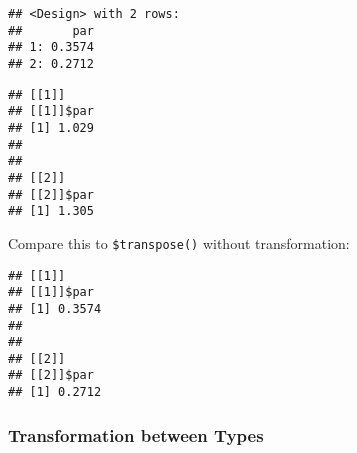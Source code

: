 \documentclass[
]{scrbook}
\newenvironment{Shaded}{\begin{snugshade}}{\end{snugshade}}
\newcommand{\AttributeTok}[1]{\textcolor[rgb]{0.77,0.63,0.00}{#1}}
\newcommand{\CommentTok}[1]{\textcolor[rgb]{0.56,0.35,0.01}{\textit{#1}}}
\newcommand{\ConstantTok}[1]{\textcolor[rgb]{0.00,0.00,0.00}{#1}}
\newcommand{\ControlFlowTok}[1]{\textcolor[rgb]{0.13,0.29,0.53}{\textbf{#1}}}
\newcommand{\DecValTok}[1]{\textcolor[rgb]{0.00,0.00,0.81}{#1}}
\newcommand{\FunctionTok}[1]{\textcolor[rgb]{0.00,0.00,0.00}{#1}}
\newcommand{\NormalTok}[1]{#1}
\newcommand{\OtherTok}[1]{\textcolor[rgb]{0.56,0.35,0.01}{#1}}
\newcommand{\SpecialCharTok}[1]{\textcolor[rgb]{0.00,0.00,0.00}{#1}}
\newcommand{\StringTok}[1]{\textcolor[rgb]{0.31,0.60,0.02}{#1}}
\renewenvironment{Shaded} {\begin{snugshade}\small} {\end{snugshade}}
\begin{document}
\begin{Shaded}
\end{Shaded}

\begin{verbatim}
## <Design> with 2 rows:
##       par
## 1: 0.3574
## 2: 0.2712
\end{verbatim}

\begin{Shaded}
\end{Shaded}

\begin{verbatim}
## [[1]]
## [[1]]$par
## [1] 1.029
## 
## 
## [[2]]
## [[2]]$par
## [1] 1.305
\end{verbatim}

Compare this to \texttt{\$transpose()} without transformation:

\begin{Shaded}
\end{Shaded}

\begin{verbatim}
## [[1]]
## [[1]]$par
## [1] 0.3574
## 
## 
## [[2]]
## [[2]]$par
## [1] 0.2712
\end{verbatim}

\hypertarget{transformation-between-types}{%
\subsubsection{Transformation between Types}\label{transformation-between-types}}
\end{document}
